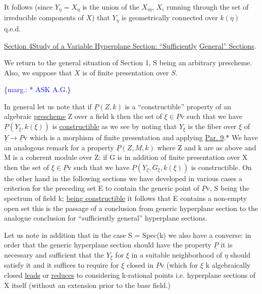 \documentclass[11pt]{article}
\newcommand{\scanpage}[1]{\par\bigskip\noindent{\small\sffamily[scan #1]}\par}
\newcommand{\mspage}[1]{{\small\sffamily[p.\,#1]}}
\newcommand{\margin}[1]{\textcolor{blue}{\{\textsf{marg.:} #1\}}}
\newcommand{\uline}[1]{\underline{#1}}
\begin{document}
It follows (since $Y_\eta = X_\eta$ is the union of the $X_{i\eta}$, $X_i$ running
through the set of irreducible components of $X$) that $Y_\eta$ is
geometrically connected over $k(\eta)$ q.e.d.

\uline{Section 4}\quad \uline{Study of a Variable Hyperplane Section:  ``Sufficiently}
\uline{General'' Sections}.

We return to the general situation of Section 1, S being an
arbitrary prescheme.  Also, we suppose that $X$ is of finite
presentation over $S$.

\margin{* ASK A.G.}

\clearpage
\scanpage{24/22}
\mspage{22}

In general let us note that if $\underline{P}(Z,k)$ is a ``constructible''
property of an algebraic \uline{prescheme} Z over a field k then the set
of $\xi \in \underline{P}$v such that we have $\underline{P}(Y_\xi, k(\xi))$ is \uline{constructible} as we see
by noting that $Y_\xi$ is the fiber over $\xi$ of $\underline{Y} \to \underline{P}$v which is a morphism
of finite presentation and applying \uline{Par. 9}.* We have an analogous
remark for a property $\underline{P}(Z, M, k)$ where Z and k are as above and M
is a coherent module over Z: if G is in addition of
finite presentation over X then the set of $\xi \in \underline{P}$v such that we have
$\underline{P}(Y_\xi, G_\xi, k(\xi))$ is constructible. On the other hand in the
following sections we have developed in various cases a criterion
for the preceding set E to contain the generic point of $\underline{P}$v, S being
the spectrum of field k; \uline{being constructible} it follows that E
contains a non-empty open set this is the passage of a conclusion
from generic hyperplane section to the analogue conclusion for
``sufficiently general'' hyperplane sections.

Let us note in addition that in the case S = Spec(k) we also
have a converse: in order that the generic hyperplane section
should have the property $\underline{P}$ it is necessary and sufficient that the
$Y_\xi$ for $\xi$ in a suitable neighborhood of $\eta$ should satisfy it and it
suffices to require for $\xi$ closed in $\underline{P}$v (which for $\xi$ k algebraically
closed \uline{leads} or \uline{reduces} to considering k-rational points i.e.
hyperplane sections of X itself (without an extension prior to the
base field.)
\end{document}
